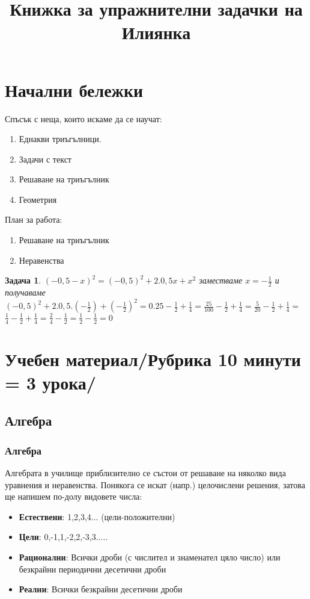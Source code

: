 \documentclass{article}
\date{}
\title{Книжка за упражнителни задачки на Илиянка}
\theoremstyle{plain}
\newtheorem*{problem*}{Задача}
\begin{document}
	
	
	\maketitle
	\tableofcontents
	
	\section{Начални бележки}
	Спъсък с неща, които искаме да се научат:
	\begin{enumerate}
		\item Еднакви триъгълници.
		\item Задачи с текст
		\item Решаване на триъгълник
		\item Геометрия
		
		
	\end{enumerate}
	План за работа:
	\begin{enumerate}
		\item Решаване на триъгълник
		\item Неравенства
	\end{enumerate}
	
	\begin{problem*}
		$(-0,5-x)^2 = (-0,5)^2 + 2.0,5x + x^2$ заместваме $x = -\frac{1}{2} $ и получаваме
	 $(-0,5)^2 + 2.0,5.(-\frac{1}{2}) + (-\frac{1}{2})^2 = 0.25 -\frac{1}{2} + \frac{1}{4}= \frac{25}{100}-\frac{1}{2} + \frac{1}{4} = \frac{5}{20}-\frac{1}{2} + \frac{1}{4} =$ \\
	 $\frac{1}{4}-\frac{1}{2} + \frac{1}{4} = \frac{2}{4} - \frac{1}{2}= \frac{1}{2} - \frac{1}{2} = 0 $ 
\end{problem*}
	\section{Учебен материал/Рубрика 10 минути = 3 урока/}
	\subsection{Алгебра}
	\subsubsection{Алгебра}
	Алгебрата в училище приблизително се състои от решаване на няколко вида уравнения и неравенства. Понякога се искат (напр.) целочислени решения, затова ще напишем по-долу видовете числа:
	\begin{itemize}
		\item \textbf{Естествени}: 1,2,3,4... (цели-положителни)	
		\item \textbf{Цели}: 0,-1,1,-2,2,-3,3.....
		\item \textbf{Рационални}: Всички дроби (с числител и знаменател  цяло число) или безкрайни периодични десетични дроби
		\item \textbf{Реални}: Всички безкрайни десетични дроби	
	\end{itemize}
\end{document}
